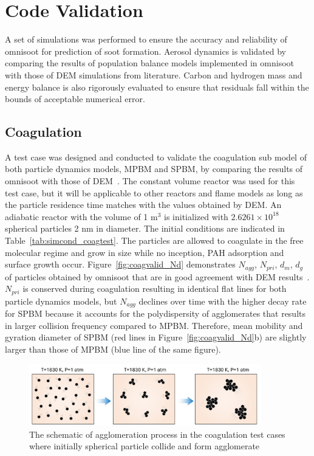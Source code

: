 \section{Code Validation}
A set of simulations was performed to ensure the accuracy and reliability of omnisoot for prediction of soot formation. Aerosol dynamics is validated by comparing the results of population balance models implemented in omnisoot with those of DEM simulations from literature. Carbon and hydrogen mass and energy balance is also rigorously evaluated to ensure that residuals fall within the bounds of acceptable numerical error.





\subsection{Coagulation}
A test case was designed and conducted to validate the coagulation sub model of both particle dynamics models, MPBM and SPBM, by comparing the results of omnisoot with those of DEM~\citep{kholghy2021surface}. The constant volume reactor was used for this test case, but it will be applicable to other reactors and flame models as long as the particle residence time matches with the values obtained by DEM. An adiabatic reactor with the volume of 1 $\mathrm{m^3}$ is initialized with $2.6261\times10^{18}$ spherical particles 2 nm in diameter. The initial conditions are indicated in Table~\ref{tab:simcond_coagtest}. The particles are allowed to coagulate in the free molecular regime and grow in size while no inception, PAH adsorption and surface growth occur. Figure~\ref{fig:coagvalid_Nd} demonstrates ${N_{agg}}$, ${N_{pri}}$, ${d_m}$, ${d_g}$ of particles obtained by omnisoot that are in good agreement with DEM results~\citep{kholghy2021surface}. ${N_{pri}}$ is conserved during coagulation resulting in identical flat lines for both particle dynamics models, but ${N_{agg}}$ declines over time with the higher decay rate for SPBM because it accounts for the polydispersity of agglomerates that results in larger collision frequency compared to MPBM. Therefore, mean mobility and gyration diameter of SPBM (red lines in Figure~\ref{fig:coagvalid_Nd}b) are slightly larger than those of MPBM (blue line of the same figure).

\begin{figure}[H]
	\centering
	\includegraphics[width=0.9\textwidth]{Figures/Results/Validation/Coagulation/coagulation_scheme.pdf}
	\caption{The schematic of agglomeration process in the coagulation test cases where initially spherical particle collide and form agglomerate}
	\label{fig:coagscheme}
\end{figure}


